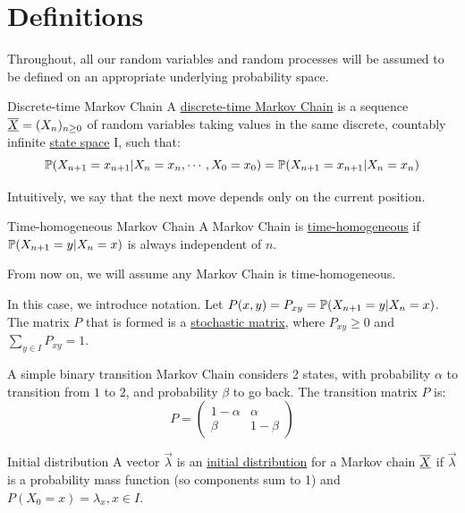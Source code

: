 \documentclass[../Main.tex]{subfiles}
\begin{document}
\section{Definitions}
Throughout, all our random variables and random processes will be assumed to be defined on an appropriate underlying probability space.

\begin{definition}{Discrete-time Markov Chain}
    A \underline{discrete-time Markov Chain} is a sequence $\chain{X} = (X_n)_{n \geq 0}$ of random variables taking values in the same discrete, countably infinite \underline{state space} I, such that:
    \begin{equation*}
        \P(X_{n+1} = x_{n + 1} | X_n = x_n, \cdots, X_0 = x_0) = \P(X_{n+1} = x_{n + 1} | X_n = x_n)
    \end{equation*}
\end{definition}
Intuitively, we say that the next move depends only on the current position.
\begin{definition}{Time-homogeneous Markov Chain}
    A Markov Chain is \underline{time-homogeneous} if $\P(X_{n+1} = y | X_n = x)$ is always independent of $n$.
\end{definition}
From now on, we will assume any Markov Chain is time-homogeneous.

In this case, we introduce notation. Let $P(x, y) = P_{xy} = \P(X_{n + 1} = y | X_n = x)$. The matrix $P$ that is formed is a \underline{stochastic matrix}, where $P_{xy} \geq 0$ and $\sum_{y \in I} P_{xy} = 1$.

\begin{example}
    A simple binary transition Markov Chain considers 2 states, with probability $\alpha$ to transition from $1$ to $2$, and probability $\beta$ to go back. The transition matrix $P$ is:
    \begin{equation*}
        P = 
        \begin{pmatrix}
            1 - \alpha & \alpha \\
            \beta & 1 - \beta
        \end{pmatrix}
    \end{equation*}
\end{example}
\begin{definition}{Initial distribution}
    A vector $\vec{\lambda}$ is an \underline{initial distribution} for a Markov chain $\chain{X}$ if $\vec{\lambda}$ is a probability mass function (so components sum to 1) and $P(X_0 = x) = \lambda_x, x \in I$.
\end{definition}
\end{document}
